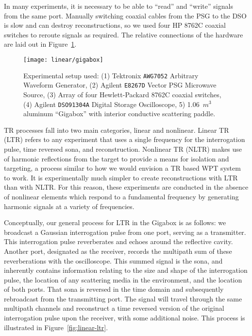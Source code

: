 In many experiments, it is necessary to be able to ``read'' and ``write'' signals from the same port. Manually switching coaxial cables from the PSG to the DSO is slow and can destroy reconstructions, so we used four HP 8762C coaxial switches to reroute signals as required. The relative connections of the hardware are laid out in Figure~\ref{fig:linear-gigabox}.

\begin{figure}[h!]
\centering
\texttt{[image: linear/gigabox]}
    \caption[Experimental Setup]{Experimental setup used: (1) Tektronix \texttt{AWG7052} Arbitrary Waveform Generator, (2) Agilent \texttt{E8267D} Vector PSG Microwave Source, (3) Array of four Hewlett-Packard 8762C coaxial switches, (4) Agilent \texttt{DSO91304A} Digital Storage Oscilloscope, 5) 1.06~$m^3$ aluminum ``Gigabox'' with interior conductive scattering paddle.}
    \label{fig:linear-gigabox}
\end{figure}

TR processes fall into two main categories, linear and nonlinear. Linear TR (LTR) refers to any experiment that uses a single frequency for the interrogation pulse, time reversed sona, and reconstruction. Nonlinear TR (NLTR) makes use of harmonic reflections from the target to provide a means for isolation and targeting, a process similar to how we would envision a TR based WPT system to work.  It is experimentally much simpler to create reconstructions with LTR than with NLTR. For this reason, these experiments are conducted in the absence of nonlinear elements which respond to a fundamental frequency by generating harmonic signals at a variety of frequencies.

Conceptually, our general process for LTR in the Gigabox is as follows: we broadcast a Gaussian interrogation pulse from one port, serving as a transmitter. This interrogation pulse reverberates and echoes around the reflective cavity. Another port, designated as the receiver, records the multipath sum of these reverberations with the oscilloscope. This summed signal is the sona, and inherently contains information relating to the size and shape of the interrogation pulse, the location of any scattering media in the environment, and the location of both ports. That sona is reversed in the time domain and subsequently rebroadcast from the transmitting port. The signal will travel through the same multipath channels and reconstruct a time reversed version of the original interrogation pulse upon the receiver, with some additional noise. This process is illustrated in Figure~\ref{fig:linear-ltr}.

